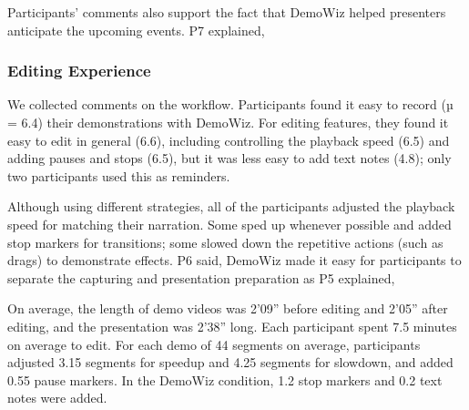Participants' comments also support the fact that DemoWiz helped presenters anticipate the upcoming events. P7 explained, 

\subsubsection{Editing Experience}
We collected comments on the workflow. Participants found it easy to record (µ = 6.4) their demonstrations with DemoWiz. For editing features, they found it easy to edit in general (6.6), including controlling the playback speed (6.5) and adding pauses and stops (6.5), but it was less easy to add text notes (4.8); only two participants used this as reminders.

Although using different strategies, all of the participants adjusted the playback speed for matching their narration. Some sped up whenever possible and added stop markers for transitions; some slowed down the repetitive actions (such as drags) to demonstrate effects. P6 said,  DemoWiz made it easy for participants to separate the capturing and presentation preparation as P5 explained, 

On average, the length of demo videos was 2'09'' before editing and 2'05'' after editing, and the presentation was 2'38'' long. Each participant spent 7.5 minutes on average to edit. For each demo of 44 segments on average, participants adjusted 3.15 segments for speedup and 4.25 segments for slowdown, and added 0.55 pause markers. In the DemoWiz condition, 1.2 stop markers and 0.2 text notes were added.
